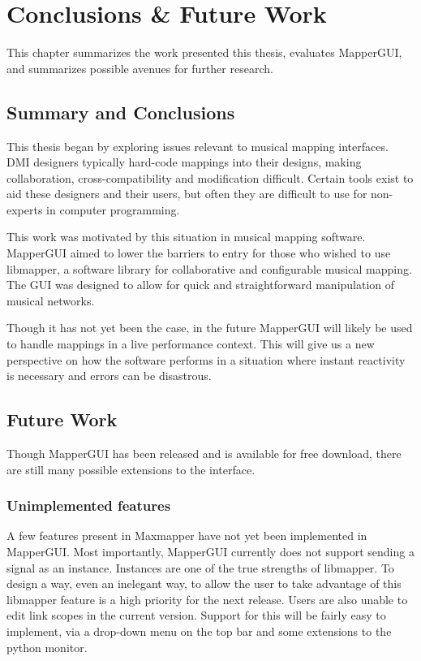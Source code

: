 \chapter{Conclusions \& Future Work}

This chapter summarizes the work presented this thesis, evaluates MapperGUI, and summarizes possible avenues for further research.

\section{Summary and Conclusions}

This thesis began by exploring issues relevant to musical mapping interfaces. DMI designers typically hard-code mappings into their designs, making collaboration, cross-compatibility and modification difficult. Certain tools exist to aid these designers and their users, but often they are difficult to use for non-experts in computer programming. 

This work was motivated by this situation in musical mapping software. MapperGUI aimed to lower the barriers to entry for those who wished to use libmapper, a software library for collaborative and configurable musical mapping. The GUI was designed to allow for quick and straightforward manipulation of musical networks. 

Though it has not yet been the case, in the future MapperGUI will likely be used to handle mappings in a live performance context. This will give us a new perspective on how the software performs in a situation where instant reactivity is necessary and errors can be disastrous. 

\section{Future Work}

Though MapperGUI has been released and is available for free download, there are still many possible extensions to the interface. 

	\subsection{Unimplemented features}

A few features present in Maxmapper have not yet been implemented in MapperGUI. Most importantly, MapperGUI currently does not support sending a signal as an instance. Instances are one of the true strengths of libmapper. To design a way, even an inelegant way, to allow the user to take advantage of this libmapper feature is a high priority for the next release. Users are also unable to edit link scopes in the current version. Support for this will be fairly easy to implement, via a drop-down menu on the top bar and some extensions to the python monitor. 

